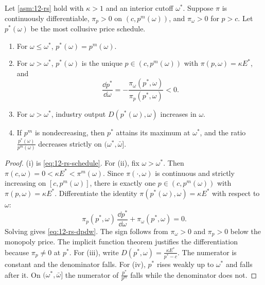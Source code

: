 \begin{proposition}\label{prop:12-rs-prices}
Let \cref{asm:12-rs} hold with $\kappa > 1$ and an interior cutoff $\omega^*$. Suppose $\pi$ is continuously
differentiable, $\pi_p > 0$ on $(c, p^m(\omega))$, and $\pi_\omega > 0$ for $p > c$. Let $p^*(\omega)$ be the most
collusive price schedule.
\begin{enumerate}[label=(\roman*)]
\item For $\omega \le \omega^*$, $p^*(\omega) = p^m(\omega)$.
\item For $\omega > \omega^*$, $p^*(\omega)$ is the unique $p \in (c, p^m(\omega))$ with $\pi(p, \omega) = \kappa E^*$, and
\begin{equation}\label{eq:12-rs-dpdw}
\frac{\dd p^*}{\dd \omega} = -\frac{\pi_\omega(p^*, \omega)}{\pi_p(p^*, \omega)} < 0 .
\end{equation}
\item For $\omega > \omega^*$, industry output $D(p^*(\omega), \omega)$ increases in $\omega$.
\item If $p^m$ is nondecreasing, then $p^*$ attains its maximum at $\omega^*$, and the ratio $\frac{p^*(\omega)}{p^m(\omega)}$
decreases strictly on $(\omega^*, \bar\omega]$.
\end{enumerate}
\end{proposition}

\begin{proof}
(i) is \eqref{eq:12-rs-schedule}. For (ii), fix $\omega > \omega^*$. Then $\pi(c, \omega) = 0 < \kappa E^* <
\pi^m(\omega)$. Since $\pi(\cdot, \omega)$ is continuous and strictly increasing on $[c, p^m(\omega)]$, there is exactly
one $p \in (c, p^m(\omega))$ with $\pi(p, \omega) = \kappa E^*$. Differentiate the identity $\pi(p^*(\omega), \omega) =
\kappa E^*$ with respect to $\omega$:
\begin{equation*}
\pi_p(p^*, \omega)\,\frac{\dd p^*}{\dd \omega} + \pi_\omega(p^*, \omega) = 0 .
\end{equation*}
Solving gives \eqref{eq:12-rs-dpdw}. The sign follows from $\pi_\omega > 0$ and $\pi_p > 0$ below the monopoly price. The
implicit function theorem justifies the differentiation because $\pi_p \neq 0$ at $p^*$. For (iii), write
$D(p^*, \omega) = \frac{\kappa E^*}{p^* - c}$. The numerator is constant and the denominator falls. For (iv), $p^*$ rises
weakly up to $\omega^*$ and falls after it. On $(\omega^*, \bar\omega]$ the numerator of $\frac{p^*}{p^m}$ falls while
the denominator does not.
\end{proof}


